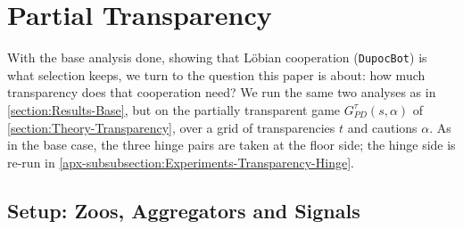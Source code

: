 

\section{Partial Transparency}
\label{section:Results-Transparency}
With the base analysis done, showing that Löbian cooperation (\texttt{DupocBot}) is what selection keeps, we turn to the question this paper is about: how much transparency does that cooperation need? We run the same two analyses as in \cref{section:Results-Base}, but on the partially transparent game $G_{PD}^{\tau}(s,\alpha)$ of \cref{section:Theory-Transparency}, over a grid of transparencies $t$ and cautions $\alpha$. As in the base case, the three hinge pairs are taken at the floor side; the hinge side is re-run in \cref{apx-subsubsection:Experiments-Transparency-Hinge}.

\subsection{Setup: Zoos, Aggregators and Signals}
\label{subsection:Results-Transparency-Env}
